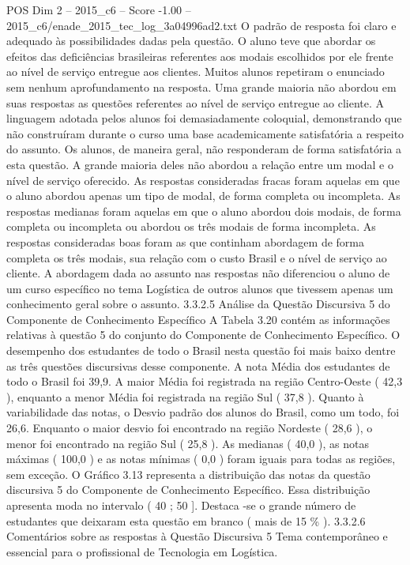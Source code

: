 \begin{textsample}{POS Dim 2 – 2015\_c6 – Score -1.00 – 2015\_c6/enade\_2015\_tec\_log\_3a04996ad2.txt}
O padrão de resposta foi claro e adequado às possibilidades dadas pela questão.
O aluno teve que abordar os efeitos das deficiências brasileiras referentes aos modais escolhidos por ele frente ao nível de serviço entregue aos clientes.
Muitos alunos repetiram o enunciado sem nenhum aprofundamento na resposta.
Uma grande maioria não abordou em suas respostas as questões referentes ao nível de serviço entregue ao cliente.
A linguagem adotada pelos alunos foi demasiadamente coloquial, demonstrando que não construíram durante o curso uma base academicamente satisfatória a respeito do assunto.
Os alunos, de maneira geral, não responderam de forma satisfatória a esta questão.
A grande maioria deles não abordou a relação entre um modal e o nível de serviço oferecido.
As respostas consideradas fracas foram aquelas em que o aluno abordou apenas um tipo de modal, de forma completa ou incompleta.
As respostas medianas foram aquelas em que o aluno abordou dois modais, de forma completa ou incompleta ou abordou os três modais de forma incompleta.
As respostas consideradas boas foram as que continham abordagem de forma completa os três modais, sua relação com o custo Brasil e o nível de serviço ao cliente.
A abordagem dada ao assunto nas respostas não diferenciou o aluno de um curso específico no tema Logística de outros alunos que tivessem apenas um conhecimento geral sobre o assunto. 3.3.2.5 Análise da Questão Discursiva 5 do Componente de Conhecimento Específico A Tabela 3.20 contém as informações relativas à questão 5 do conjunto do Componente de Conhecimento Específico.
O desempenho dos estudantes de todo o Brasil nesta questão foi mais baixo dentre as três questões discursivas desse componente.
A nota Média dos estudantes de todo o Brasil foi 39,9.
A maior Média foi registrada na região Centro-Oeste ( 42,3 ), enquanto a menor Média foi registrada na região Sul ( 37,8 ).
Quanto à variabilidade das notas, o Desvio padrão dos alunos do Brasil, como um todo, foi 26,6.
Enquanto o maior desvio foi encontrado na região Nordeste ( 28,6 ), o menor foi encontrado na região Sul ( 25,8 ).
As medianas ( 40,0 ), as notas máximas ( 100,0 ) e as notas mínimas ( 0,0 ) foram iguais para todas as regiões, sem exceção.
O Gráfico 3.13 representa a distribuição das notas da questão discursiva 5 do Componente de Conhecimento Específico.
Essa distribuição apresenta moda no intervalo ( 40 ; 50 ].
Destaca -se o grande número de estudantes que deixaram esta questão em branco ( mais de 15 \% ). 3.3.2.6 Comentários sobre as respostas à Questão Discursiva 5 Tema contemporâneo e essencial para o profissional de Tecnologia em Logística.

\end{textsample}
